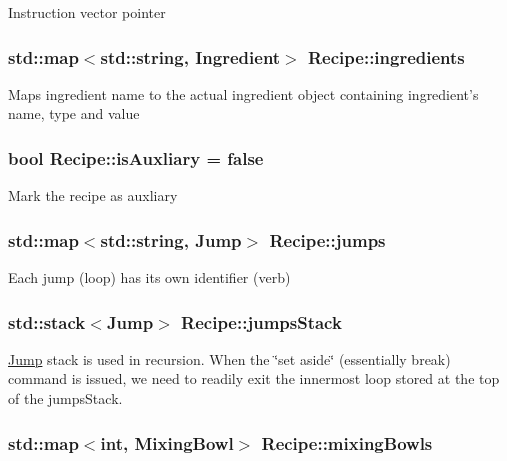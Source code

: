 Instruction vector pointer \hypertarget{classRecipe_a5fa367694eb22ad1aa480feda0df8444}{
\subsubsection[{ingredients}]{\setlength{\rightskip}{0pt plus 5cm}std\-::map$<$std\-::string, {\bf Ingredient}$>$ Recipe\-::ingredients\hspace{0.3cm}{\ttfamily [private]}}}\label{classRecipe_a5fa367694eb22ad1aa480feda0df8444}
Maps ingredient name to the actual ingredient object containing ingredient's name, type and value \hypertarget{classRecipe_a3edfc934ad30f52f01dc90630b0decaa}{
\subsubsection[{is\-Auxliary}]{\setlength{\rightskip}{0pt plus 5cm}bool Recipe\-::is\-Auxliary = false\hspace{0.3cm}{\ttfamily [private]}}}\label{classRecipe_a3edfc934ad30f52f01dc90630b0decaa}
Mark the recipe as auxliary \hypertarget{classRecipe_a1e3f8326650076f4b111c36a945ba39c}{
\subsubsection[{jumps}]{\setlength{\rightskip}{0pt plus 5cm}std\-::map$<$std\-::string, {\bf Jump}$>$ Recipe\-::jumps\hspace{0.3cm}{\ttfamily [private]}}}\label{classRecipe_a1e3f8326650076f4b111c36a945ba39c}
Each jump (loop) has its own identifier (verb) \hypertarget{classRecipe_ac77f2bfae96f952d40ab79163d94c659}{
\subsubsection[{jumps\-Stack}]{\setlength{\rightskip}{0pt plus 5cm}std\-::stack$<${\bf Jump}$>$ Recipe\-::jumps\-Stack\hspace{0.3cm}{\ttfamily [private]}}}\label{classRecipe_ac77f2bfae96f952d40ab79163d94c659}
\hyperlink{structJump}{Jump} stack is used in recursion. When the \char`\"{}set aside\char`\"{} (essentially break) command is issued, we need to readily exit the innermost loop stored at the top of the jumps\-Stack. \hypertarget{classRecipe_aab5e3eecd432df72ba75c4da724e27f0}{
\subsubsection[{mixing\-Bowls}]{\setlength{\rightskip}{0pt plus 5cm}std\-::map$<$int, {\bf Mixing\-Bowl}$>$ Recipe\-::mixing\-Bowls\hspace{0.3cm}{\ttfamily [private]}}}\label{classRecipe_aab5e3eecd432df72ba75c4da724e27f0}
